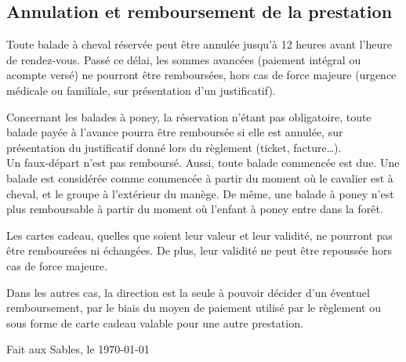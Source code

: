 \documentclass[11pt,a4paper]{article}
\begin{document}
\subsection*{Annulation et remboursement de la prestation}
Toute balade à cheval réservée peut être annulée jusqu'à 12 heures avant l'heure de rendez-vous. Passé ce délai, les sommes avancées (paiement intégral ou acompte versé) ne pourront être remboursées, hors cas de force majeure (urgence médicale ou familiale, sur présentation d'un justificatif).

Concernant les balades à poney, la réservation n'étant pas obligatoire, toute balade payée à l'avance pourra être remboursée si elle est annulée, sur présentation du justificatif donné lors du règlement (ticket, facture\dots).
\\

Un faux-départ n'est pas remboursé. Aussi, toute balade commencée est due. Une balade est considérée comme \og commencée \fg{} à partir du moment où le cavalier est à cheval, et le groupe à l'extérieur du manège. De même, une balade à poney n'est plus remboursable à partir du moment où l'enfant à poney entre dans la forêt.

Les cartes cadeau, quelles que soient leur valeur et leur validité, ne pourront pas être remboursées ni échangées. De plus, leur validité ne peut être repoussée hors cas de force majeure.

Dans les autres cas, la direction est la seule à pouvoir décider d'un éventuel remboursement, par le biais du moyen de paiement utilisé par le règlement ou sous forme de \og carte cadeau \fg{} valable pour une autre prestation.


\vfill
\begin{flushright}
	Fait aux Sables, le \today
\end{flushright}
\end{document}
